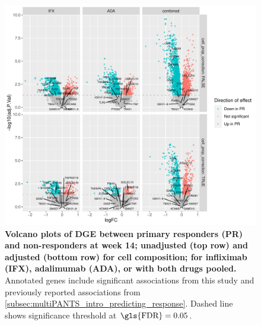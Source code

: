 \begin{figure}
    \centering
    \includegraphics[width=1.0\textwidth,page=1]{mainmatter/figures/chapter_04/plot_gene_set_enrichment.dge_result_volcano_simple_C_3RI_3NI,C_3RA_3NA,C_3R_3N.pdf}
    \caption{
        \textbf{Volcano plots of \gls{DGE} between primary responders (PR) and non-responders at week 14; unadjusted (top row) and adjusted (bottom row) for cell composition; for infliximab (IFX), adalimumab (ADA), or with both drugs pooled.}
        Annotated genes include significant associations from this study and previously reported associations from \autoref{subsec:multiPANTS_intro_predicting_response}.
        Dashed line shows significance threshold at $\text{\gls{FDR}} = 0.05$.
    }
    \label{fig:multipants_dge_volcano_week_14_R_N}
\end{figure}

